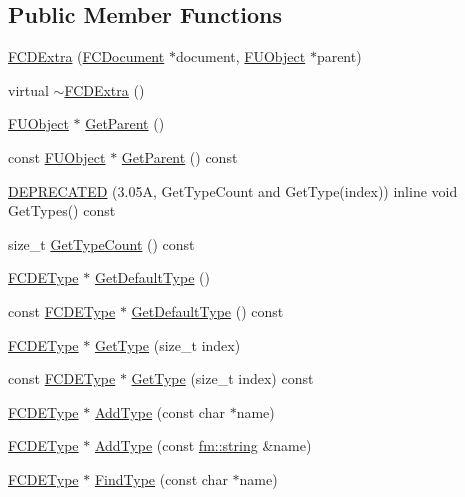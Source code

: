 \subsection*{Public Member Functions}
\begin{DoxyCompactItemize}
\item 
\hyperlink{classFCDExtra_a9a55fbd9968c5aafa3e33029b18d7363}{FCDExtra} (\hyperlink{classFCDocument}{FCDocument} $\ast$document, \hyperlink{classFUObject}{FUObject} $\ast$parent)
\item 
virtual \hyperlink{classFCDExtra_a5be907c8a698237eb99e397b84b6522b}{$\sim$FCDExtra} ()
\item 
\hyperlink{classFUObject}{FUObject} $\ast$ \hyperlink{classFCDExtra_a88eb6096fb1fb66b0d23806edd895c92}{GetParent} ()
\item 
const \hyperlink{classFUObject}{FUObject} $\ast$ \hyperlink{classFCDExtra_a1db4b3dd676a6307beb8c513fe3ddb10}{GetParent} () const 
\item 
\hyperlink{classFCDExtra_ab5e41af4e9cf729bb249029d6a6ec7ba}{DEPRECATED} (3.05A, GetTypeCount and GetType(index)) inline void GetTypes() const 
\item 
size\_\-t \hyperlink{classFCDExtra_a4a406f3eac69ab943f1ba4cb59c408f4}{GetTypeCount} () const 
\item 
\hyperlink{classFCDEType}{FCDEType} $\ast$ \hyperlink{classFCDExtra_aa321c349e458ac3f066667cc216ed084}{GetDefaultType} ()
\item 
const \hyperlink{classFCDEType}{FCDEType} $\ast$ \hyperlink{classFCDExtra_aa8171b62f9c4a47de2a554fd44f16755}{GetDefaultType} () const 
\item 
\hyperlink{classFCDEType}{FCDEType} $\ast$ \hyperlink{classFCDExtra_ae5a12efc807894f8b585ec1fefbc5164}{GetType} (size\_\-t index)
\item 
const \hyperlink{classFCDEType}{FCDEType} $\ast$ \hyperlink{classFCDExtra_af3a40c3de673c3f68350895cd3930a29}{GetType} (size\_\-t index) const 
\item 
\hyperlink{classFCDEType}{FCDEType} $\ast$ \hyperlink{classFCDExtra_abfa9e4ba6b5df94fc3e64df6430e20f6}{AddType} (const char $\ast$name)
\item 
\hyperlink{classFCDEType}{FCDEType} $\ast$ \hyperlink{classFCDExtra_ae46d3a3a75deeea46c603b91cb7acef5}{AddType} (const \hyperlink{classfm_1_1stringT}{fm::string} \&name)
\item 
\hyperlink{classFCDEType}{FCDEType} $\ast$ \hyperlink{classFCDExtra_a64f1bee9cf00ba3401869a8296a9eff3}{FindType} (const char $\ast$name)
\item 

\end{DoxyCompactItemize}
